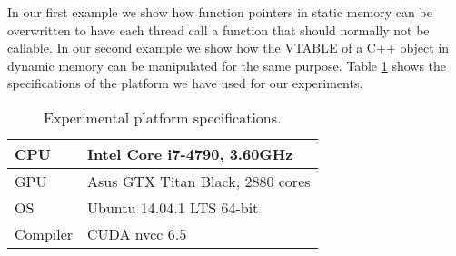 \documentclass[11pt]{llncs}
\begin{document}
In our first example we show how function pointers in static memory can be overwritten to have each thread call a function that should normally not be callable.
In our second example we show how the VTABLE of a C++ object in dynamic memory can be manipulated for the same purpose.
Table \ref{tab:specs} shows the specifications of the platform we have used for our experiments.
\begin{table}[!htp]
\centering
\caption{Experimental platform specifications.}
\label{tab:specs}
\begin{tabular}{|l|l|}
\hline
CPU & Intel Core i7-4790, 3.60GHz \\ \hline
GPU & Asus GTX Titan Black, 2880 cores\\ \hline
OS & Ubuntu 14.04.1 LTS 64-bit \\ \hline
Compiler & CUDA nvcc 6.5 \\ \hline
\end{tabular}
\end{table}
\end{document}
